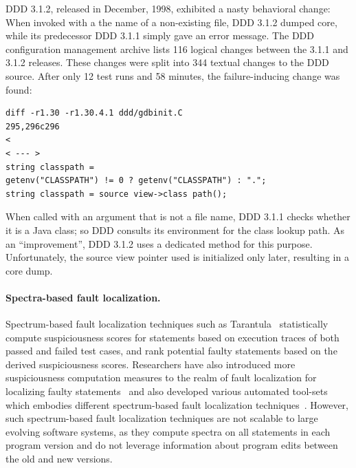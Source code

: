  DDD 3.1.2, released in December, 1998, exhibited a nasty behavioral change: When invoked with a the name of a non-existing file, DDD 3.1.2 dumped core, while its predecessor DDD 3.1.1 simply gave an error message. The DDD configuration management archive lists 116 logical changes between the 3.1.1 and 3.1.2 releases. These changes were split into 344 textual changes to the DDD source. After only 12 test runs and 58 minutes, the failure-inducing change was found: 
\begin{verbatim}
diff -r1.30 -r1.30.4.1 ddd/gdbinit.C 
295,296c296
<
< --- >
string classpath =
getenv("CLASSPATH") != 0 ? getenv("CLASSPATH") : ".";
string classpath = source view->class path();
\end{verbatim} 

When called with an argument that is not a file name, DDD 3.1.1 checks whether it is a Java class; so DDD consults its environment for the class lookup path. As an ``improvement'', DDD 3.1.2 uses a dedicated method for this purpose. Unfortunately, the source view pointer used is initialized only later, resulting in a core dump. 


\paragraph{Spectra-based fault localization.} Spectrum-based fault localization techniques such as Tarantula~\cite{Jones2002:tarantula} statistically compute suspiciousness scores for statements based on execution traces of both passed and failed test cases, and rank potential faulty statements based on the derived suspiciousness scores. Researchers have also introduced more suspiciousness computation measures to the realm of fault localization for localizing faulty statements~\cite{naish2011model, lo2010comprehensive} and also developed various automated tool-sets which embodies different spectrum-based fault localization techniques~\cite{tarantula-url, janssen2009zoltar}. However, such spectrum-based fault localization techniques are not scalable to large evolving software systems, as they compute spectra on all statements in each program version and do not leverage information about program edits between the old and new versions.

